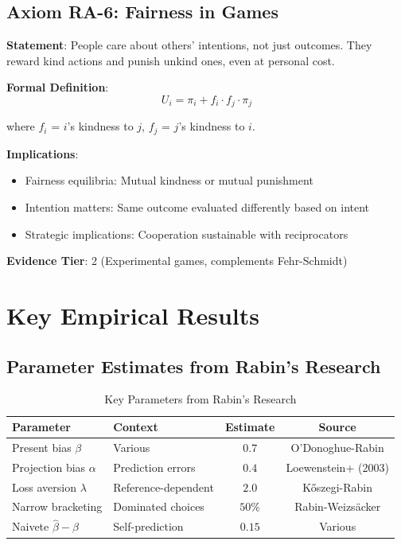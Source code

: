 \subsection{Axiom RA-6: Fairness in Games}

\begin{tcolorbox}[colback=green!5!white,colframe=green!75!black,title=Axiom RA-6: Reciprocal Fairness]
\textbf{Statement}: People care about others' intentions, not just outcomes. They reward kind actions and punish unkind ones, even at personal cost.

\textbf{Formal Definition}:
\begin{equation}
U_i = \pi_i + f_i \cdot f_j \cdot \pi_j
\end{equation}

where $f_i$ = $i$'s kindness to $j$, $f_j$ = $j$'s kindness to $i$.

\textbf{Implications}:
\begin{itemize}
    \item Fairness equilibria: Mutual kindness or mutual punishment
    \item Intention matters: Same outcome evaluated differently based on intent
    \item Strategic implications: Cooperation sustainable with reciprocators
\end{itemize}

\textbf{Evidence Tier}: 2 (Experimental games, complements Fehr-Schmidt)
\end{tcolorbox}

\section{Key Empirical Results}

\subsection{Parameter Estimates from Rabin's Research}

\begin{table}[h]
\centering
\caption{Key Parameters from Rabin's Research}
\label{tab:rabin-parameters}
\begin{tabular}{llcc}
\toprule
\textbf{Parameter} & \textbf{Context} & \textbf{Estimate} & \textbf{Source} \\
\midrule
Present bias $\beta$ & Various & $0.7$ & O'Donoghue-Rabin \\
Projection bias $\alpha$ & Prediction errors & $0.4$ & Loewenstein+ (2003) \\
Loss aversion $\lambda$ & Reference-dependent & $2.0$ & Kőszegi-Rabin \\
Narrow bracketing & Dominated choices & $50\%$ & Rabin-Weizsäcker \\
Naivete $\hat{\beta} - \beta$ & Self-prediction & $0.15$ & Various \\
\bottomrule
\end{tabular}
\end{table}

